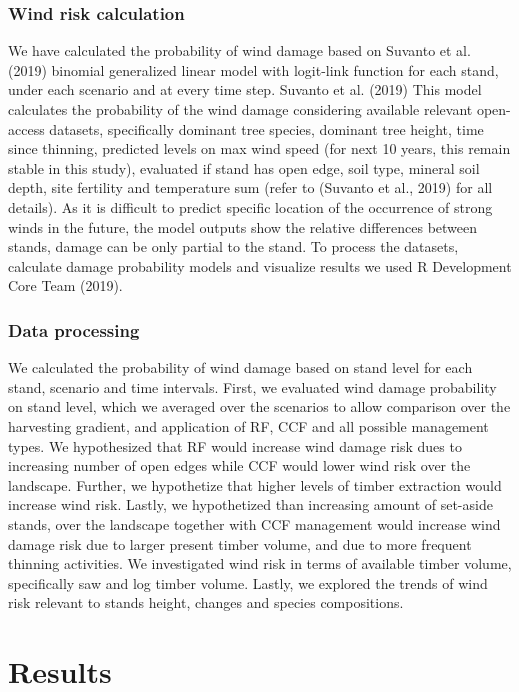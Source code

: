 \documentclass[]{elsarticle} %
\begin{document}
\subsubsection{Wind risk calculation}\label{wind-risk-calculation}

We have calculated the probability of wind damage based on Suvanto et
al. (2019) binomial generalized linear model with logit-link function
for each stand, under each scenario and at every time step. Suvanto et
al. (2019) This model calculates the probability of the wind damage
considering available relevant open-access datasets, specifically
dominant tree species, dominant tree height, time since thinning,
predicted levels on max wind speed (for next 10 years, this remain
stable in this study), evaluated if stand has open edge, soil type,
mineral soil depth, site fertility and temperature sum (refer to
(Suvanto et al., 2019) for all details). As it is difficult to predict
specific location of the occurrence of strong winds in the future, the
model outputs show the relative differences between stands, damage can
be only partial to the stand. To process the datasets, calculate damage
probability models and visualize results we used R Development Core Team
(2019).

\subsubsection{Data processing}\label{data-processing}

We calculated the probability of wind damage based on stand level for
each stand, scenario and time intervals. First, we evaluated wind damage
probability on stand level, which we averaged over the scenarios to
allow comparison over the harvesting gradient, and application of RF,
CCF and all possible management types. We hypothesized that RF would
increase wind damage risk dues to increasing number of open edges while
CCF would lower wind risk over the landscape. Further, we hypothetize
that higher levels of timber extraction would increase wind risk.
Lastly, we hypothetized than increasing amount of set-aside stands, over
the landscape together with CCF management would increase wind damage
risk due to larger present timber volume, and due to more frequent
thinning activities. We investigated wind risk in terms of available
timber volume, specifically saw and log timber volume. Lastly, we
explored the trends of wind risk relevant to stands height, changes and
species compositions.

\section{Results}\label{results}
\end{document}

